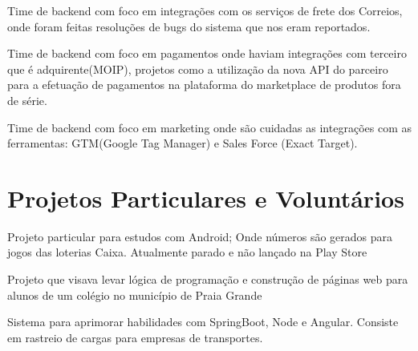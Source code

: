 \documentclass[]{deedy-resume-openfont}
\begin{document}
\begin{minipage}[t]{0.66\textwidth}
\begin{tightemize}
\item Time de backend com foco em integrações com os serviços de frete dos Correios, onde foram feitas resoluções de bugs do sistema que nos eram reportados.
\item Time de backend com foco em pagamentos onde haviam integrações com terceiro que é adquirente(MOIP), projetos como a utilização da nova API do parceiro para a efetuação de pagamentos na plataforma do marketplace de produtos fora de série.
\item Time de backend com foco em marketing onde são cuidadas as integrações com as ferramentas: GTM(Google Tag Manager) e Sales Force (Exact Target).
\end{tightemize}
\sectionsep

\section{Projetos Particulares e Voluntários}
Projeto particular para estudos com Android; Onde números são gerados para jogos das loterias Caixa. Atualmente parado e não lançado na Play Store \sectionsep

Projeto que visava levar lógica de programação e construção de páginas web para alunos de um colégio no município de Praia Grande \sectionsep

Sistema para aprimorar habilidades com SpringBoot, Node e Angular. Consiste em rastreio de cargas para empresas de transportes. \sectionsep

\end{minipage} 
\end{document}
